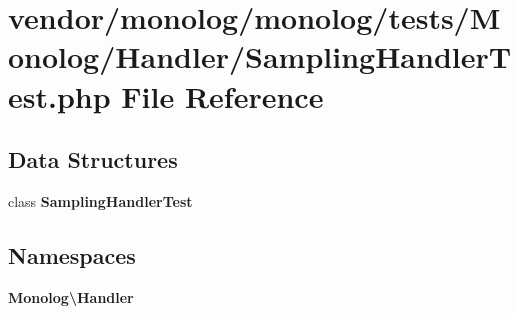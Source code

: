 \section{vendor/monolog/monolog/tests/\+Monolog/\+Handler/\+Sampling\+Handler\+Test.php File Reference}
\label{_sampling_handler_test_8php}
\subsection*{Data Structures}
\begin{DoxyCompactItemize}
\item 
class {\bf Sampling\+Handler\+Test}
\end{DoxyCompactItemize}
\subsection*{Namespaces}
\begin{DoxyCompactItemize}
\item 
 {\bf Monolog\textbackslash{}\+Handler}
\end{DoxyCompactItemize}
